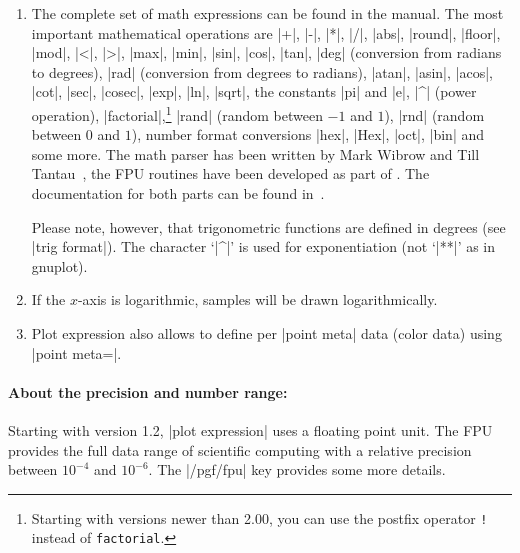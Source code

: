 {\begin{addplotoperation}[]{}{}
\begin{enumerate}
            The variable name can be customized using |variable=t|. Then, |t|
            will be the same as |\t|.
        \item The complete set of math expressions can be found in the \PGF{}
            manual. The most important mathematical operations are |+|, |-|,
            |*|, |/|, |abs|, |round|, |floor|, |mod|, |<|, |>|, |max|, |min|,
            |sin|, |cos|, |tan|, |deg| (conversion from radians to degrees),
            |rad| (conversion from degrees to radians), |atan|, |asin|,
            |acos|, |cot|, |sec|, |cosec|, |exp|, |ln|, |sqrt|, the constants
            |pi| and |e|, |^| (power operation),
            |factorial|,\footnote{Starting with \PGF{} versions newer than
            2.00, you can use the postfix operator \texttt{!} instead of
            \texttt{factorial}.} |rand| (random between $-1$ and $1$), |rnd|
            (random between $0$ and $1$), number format conversions |hex|,
            |Hex|, |oct|, |bin| and some more. The math parser has been
            written by Mark Wibrow and Till Tantau~\cite{tikz}, the FPU
            routines have been developed as part of \PGFPlots{}. The
            documentation for both parts can be found in~\cite{tikz}.

            Please note, however, that trigonometric functions are defined in
            degrees (see |trig format|). The character `|^|' is used for
            exponentiation (not `|**|' as in gnuplot).
        \item If the $x$-axis is logarithmic, samples will be drawn
            logarithmically.
        \item Plot expression also allows to define per |point meta| data
            (color data) using |point meta=|.
    \end{enumerate}


    \paragraph{About the precision and number range:}

    Starting with version 1.2, |plot expression| uses a floating point unit.
    The FPU provides the full data range of scientific computing with a
    relative precision between $10^{-4}$ and $10^{-6}$. The |/pgf/fpu| key
    provides some more details.


\end{addplotoperation}}
